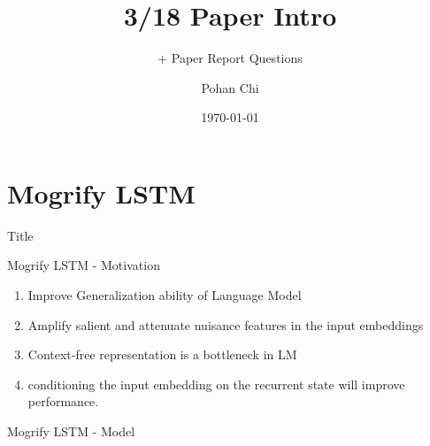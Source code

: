 \documentclass[10pt]{beamer}
\title{3/18 Paper Intro}
\subtitle{ + Paper Report Questions}
\author{Pohan Chi}
\date{\today}
\begin{document}
\maketitle

\maketoc

\section{Mogrify LSTM}

\begin{frame}{Title}

    \begin{figure}
        \centering 
    \end{figure}

\end{frame}

\begin{frame}{Mogrify LSTM - Motivation}
    \begin{enumerate}
        \item Improve Generalization ability of Language Model
        \item Amplify salient and attenuate nuisance features in the input embeddings
        \item Context-free representation is a bottleneck in LM
        \item conditioning the input embedding on the recurrent state will improve performance. 
    \end{enumerate}
\end{frame}

\begin{frame}{Mogrify LSTM - Model}

    \begin{figure}
        \begin{center}
        \end{center}
    \end{figure}

\end{frame}
\end{document}
